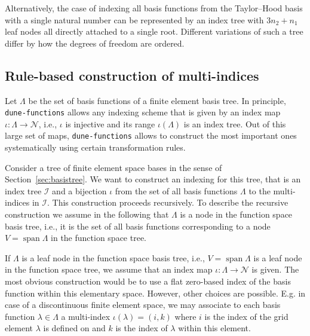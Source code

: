 \documentclass[a4paper,10pt,headings=normal,bibliography=totoc]{scrartcl}
\newcommand{\dunemodule}[1]{\texttt{#1}}
\begin{document}
Alternatively, the case of indexing all basis functions from the Taylor--Hood basis with a single
natural number can be represented by an index tree with $3 n_2 + n_1$ leaf nodes all
directly attached to a single root. Different variations of such a tree differ by how the
degrees of freedom are ordered.




\subsection{Rule-based construction of multi-indices}
\label{sec:index_strategies}

Let $\Lambda$ be the set of basis functions of a finite element basis tree.
In principle, \dunemodule{dune-functions} allows any indexing scheme that
is given by an index map $\iota: \Lambda \to \mathcal{N}$,
i.e., $\iota$ is injective and its range $\iota(\Lambda)$ is an index tree.
Out of this large set of maps, \dunemodule{dune-functions} allows to construct the most
important ones systematically using certain transformation rules.

Consider a tree of finite element space bases in the sense of Section~\ref{sec:basistree}.
We want to construct an indexing for this tree, that is
an index tree $\mathcal{I}$ and a bijection $\iota$ from the set of all basis functions $\Lambda$
to the multi-indices in $\mathcal{I}$. This construction proceeds recursively.
To describe the recursive construction
we assume in the following that $\Lambda$ is a node in the function space
basis tree, i.e., it is the set of all basis functions
corresponding to a node $V=\operatorname{span} \Lambda$
in the function space tree.

If $\Lambda$ is a leaf node
in the function space basis tree, i.e., $V=\operatorname{span} \Lambda$ is
a leaf node in the function space tree,
we assume that an index map $\iota : \Lambda \to \mathcal{N}$
is given. The most obvious construction would be to use a flat zero-based index
of the basis function within this elementary space. However, other choices are possible.
E.g. in case of a discontinuous finite element space, we may associate to each
basis function $\lambda \in \Lambda$ a multi-index $\iota(\lambda)=(i,k)$ where $i$ is the
index of the grid element $\lambda$ is defined on and $k$ is the index of $\lambda$
within this element.
\end{document}
